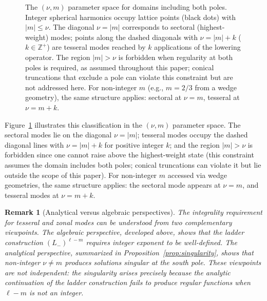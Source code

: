 \documentclass[
  aip,
  amsmath,amssymb,
  preprint
]{revtex4-1}
\newtheorem{remark}{Remark}[section]
\begin{document}
\begin{figure}[t]
\caption{The $(\nu, m)$ parameter space for domains including both poles. Integer spherical harmonics occupy lattice points (black dots) with $|m| \leq \nu$. The diagonal $\nu = |m|$ corresponds to sectoral (highest-weight) modes; points along the dashed diagonals with $\nu = |m| + k$ ($k \in \mathbb{Z}^+$) are tesseral modes reached by $k$ applications of the lowering operator. The region $|m| > \nu$ is forbidden when regularity at both poles is required, as assumed throughout this paper; conical truncations that exclude a pole can violate this constraint but are not addressed here. For non-integer $m$ (e.g., $m = 2/3$ from a wedge geometry), the same structure applies: sectoral at $\nu = m$, tesseral at $\nu = m + k$.}
\label{fig:parameter_space}
\end{figure}
Figure~\ref{fig:parameter_space} illustrates this classification in the 
$(\nu, m)$ parameter space. The sectoral modes lie on the diagonal 
$\nu = |m|$; tesseral modes occupy the dashed diagonal lines with 
$\nu = |m| + k$ for positive integer $k$; and the region $|m| > \nu$ 
is forbidden since one cannot raise above the highest-weight state 
(this constraint assumes the domain includes both poles; conical 
truncations can violate it but lie outside the scope of this paper). 
For non-integer $m$ accessed via wedge geometries, the same structure 
applies: the sectoral mode appears at $\nu = m$, and tesseral modes 
at $\nu = m + k$.

\begin{remark}[Analytical versus algebraic perspectives]
The integrality requirement for tesseral and zonal modes can be understood from two complementary viewpoints. The algebraic perspective, developed above, shows that the ladder construction $(L_-)^{\ell-m}$ requires integer exponent to be well-defined. The analytical perspective, summarized in Proposition~\ref{prop:singularity}, shows that non-integer $\nu \neq m$ produces solutions singular at the south pole. These viewpoints are not independent: the singularity arises precisely because the analytic continuation of the ladder construction fails to produce regular functions when $\ell - m$ is not an integer.
\end{remark}
\end{document}
